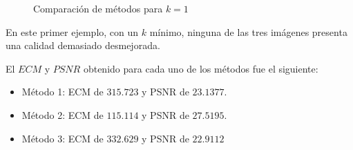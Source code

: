 \begin{figure}[H]
    \centering
    \qquad
    \qquad
    \caption{Comparación de métodos para $k = 1$}
    \label{fig:example}
\end{figure}

En este primer ejemplo, con un $k$ mínimo, ninguna de las tres imágenes presenta una calidad demasiado desmejorada.

El $ECM$ y $PSNR$ obtenido para cada uno de los métodos fue el siguiente:
\begin{itemize}
 \item Método 1: ECM de $315.723$ y PSNR de $23.1377$.
 \item Método 2: ECM de $115.114$ y PSNR de $27.5195$.
 \item Método 3: ECM de $332.629$ y PSNR de $22.9112$
\end{itemize}

